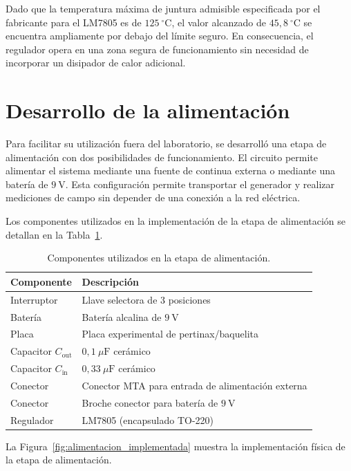 Dado que la temperatura máxima de juntura admisible especificada por el fabricante para el LM7805 \cite{LM7805} es de $125~^\circ\mathrm{C}$, el valor alcanzado de $45{,}8~^\circ\mathrm{C}$ se encuentra ampliamente por debajo del límite seguro. En consecuencia, el regulador opera en una zona segura de funcionamiento sin necesidad de incorporar un disipador de calor adicional.

\section{Desarrollo de la alimentación}

Para facilitar su utilización fuera del laboratorio, se desarrolló una etapa de alimentación con dos posibilidades de funcionamiento. El circuito permite alimentar el sistema mediante una fuente de continua externa o mediante una batería de $9~\mathrm{V}$. Esta configuración permite transportar el generador y realizar mediciones de campo sin depender de una conexión a la red eléctrica.

Los componentes utilizados en la implementación de la etapa de alimentación se detallan en la Tabla~\ref{tab:componentes_alimentacion}.

\begin{table}[H]
\centering
\begin{tabular}{|l|l|}
\hline
\textbf{Componente} & \textbf{Descripción} \\ \hline
Interruptor & Llave selectora de 3 posiciones \\ \hline
Batería & Batería alcalina de $9~\mathrm{V}$ \\ \hline
Placa & Placa experimental de pertinax/baquelita \\ \hline
Capacitor $C_{\text{out}}$ & $0{,}1~\mu\mathrm{F}$ cerámico \\ \hline
Capacitor $C_{\text{in}}$ & $0{,}33~\mu\mathrm{F}$ cerámico \\ \hline
Conector & Conector MTA para entrada de alimentación externa \\ \hline
Conector & Broche conector para batería de $9~\mathrm{V}$ \\ \hline
Regulador & LM7805 (encapsulado TO-220) \\ \hline
\end{tabular}
\caption{Componentes utilizados en la etapa de alimentación.}
\label{tab:componentes_alimentacion}
\end{table}

La Figura~\ref{fig:alimentacion_implementada} muestra la implementación física de la etapa de alimentación.

